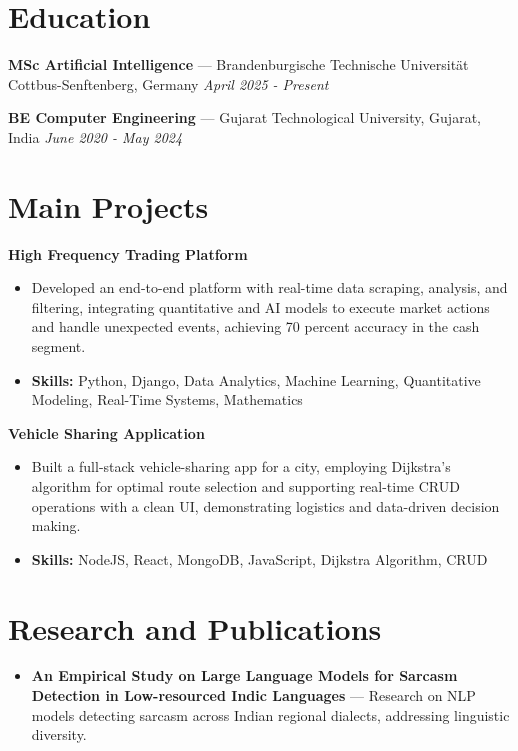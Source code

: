 \documentclass[a4paper,10pt]{article}
\begin{document}
\section*{Education}
\textbf{MSc Artificial Intelligence} — Brandenburgische Technische Universität Cottbus-Senftenberg, Germany \hfill \textit{April 2025 - Present}\par
\vspace{1.5pt}
\textbf{BE Computer Engineering} — Gujarat Technological University, Gujarat, India \hfill \textit{June 2020 - May 2024}\par

\section*{Main Projects}
\textbf{High Frequency Trading Platform}\par
\vspace{1pt}
\begin{itemize}
  \item Developed an end-to-end platform with real-time data scraping, analysis, and filtering, integrating quantitative and AI models to execute market actions and handle unexpected events, achieving 70 percent accuracy in the cash segment.
  \item \textbf{Skills:} Python, Django, Data Analytics, Machine Learning, Quantitative Modeling, Real-Time Systems, Mathematics
\end{itemize}
\vspace{3pt}
\textbf{Vehicle Sharing Application}\par
\vspace{1pt}
\begin{itemize}
  \item Built a full-stack vehicle-sharing app for a city, employing Dijkstra's algorithm for optimal route selection and supporting real-time CRUD operations with a clean UI, demonstrating logistics and data-driven decision making.
  \item \textbf{Skills:} NodeJS, React, MongoDB, JavaScript, Dijkstra Algorithm, CRUD
\end{itemize}

\section*{Research and Publications}
\begin{itemize}
\item \textbf{An Empirical Study on Large Language Models for Sarcasm Detection in Low-resourced Indic Languages} — Research on NLP models detecting sarcasm across Indian regional dialects, addressing linguistic diversity.
\end{itemize}
\end{document}
